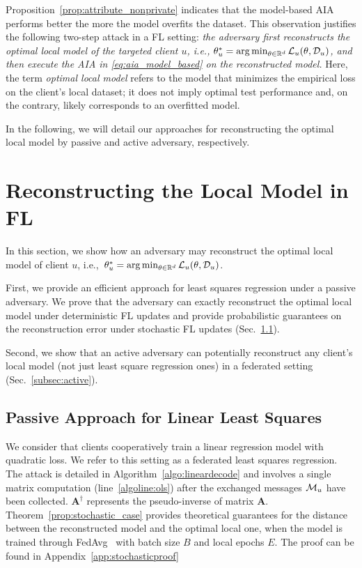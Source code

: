 Proposition~\ref{prop:attribute_nonprivate} indicates that the model-based AIA performs better the more the model overfits the dataset.
This observation justifies the following two-step attack in a FL setting: 
\emph{the adversary first reconstructs the optimal local model of the targeted client $u$, i.e., $\theta_u^* = \arg\min_{\theta\in \mathbb{R}^d} {\mathcal{L}_u}(\theta, \mathcal{D}_u)$, and then execute the AIA in \eqref{eq:aia_model_based} on the reconstructed model.} Here, the term \emph{optimal local model} refers to the model that minimizes the empirical loss on the client’s local dataset; it does not imply optimal test performance and, on the contrary, likely corresponds to an overfitted model.


In the following, we will detail our approaches for reconstructing the optimal local model by passive and active adversary, respectively.   

\section{Reconstructing the Local Model in FL}\label{sec:lmra}
In this section, we show how an adversary may reconstruct the optimal local model of client $u$, i.e.,~$\theta_u^* = \arg\min_{\theta\in \mathbb{R}^d} {\mathcal{L}_u}(\theta, \mathcal{D}_u)$.

First, we provide an efficient approach for least squares regression under a passive adversary. We prove that the adversary can exactly reconstruct the optimal local model under deterministic FL updates and provide probabilistic guarantees on the reconstruction error under stochastic FL updates (Sec.~\ref{sec:exact}).

Second, we show that an active adversary can potentially reconstruct any client's local model (not just least square regression ones) in a federated setting (Sec.~\ref{subsec:active}).


\subsection{Passive Approach for Linear Least Squares}\label{sec:exact}

We consider that clients cooperatively train a linear regression model with quadratic loss. We refer to this setting as a federated least squares regression.  %
The attack is detailed in Algorithm~\ref{algo:lineardecode} and  involves a single matrix computation (line~\ref{algoline:ols}) after the exchanged messages $\mathcal{M}_u$ have been collected. $\mathbf{A}^\dagger$ represents the pseudo-inverse of matrix $\mathbf{A}$.  
Theorem~\ref{prop:stochastic_case} provides theoretical guarantees for the distance between the reconstructed model and the optimal local one, when the model is trained through FedAvg~\cite{pmlr-v54-mcmahan17a} with batch size $B$ and local epochs $E$. The proof can be found in Appendix~\ref{app:stochasticproof}

